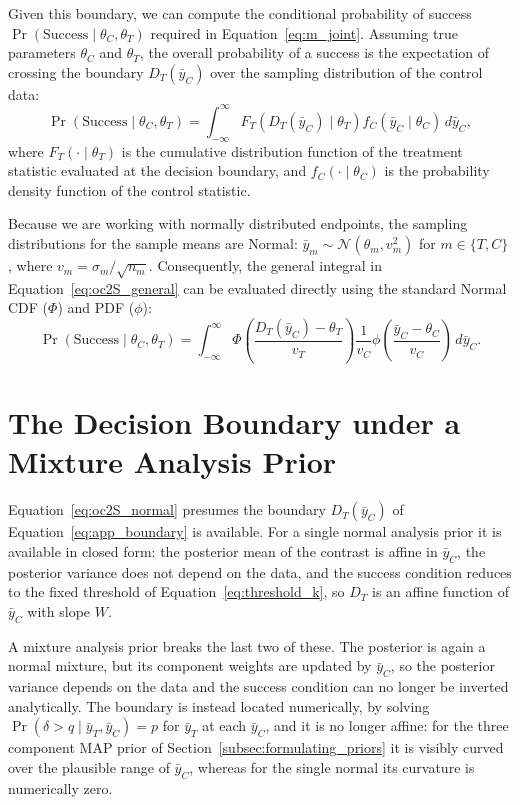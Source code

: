Given this boundary, we can compute the conditional probability of success $\Pr(\text{Success} \mid \theta_C, \theta_T)$ required in Equation~\eqref{eq:m_joint}. Assuming
 true parameters $\theta_C$ and $\theta_T$, the overall probability of a success is the expectation of crossing the boundary $D_T(\bar{y}_C)$ over the sampling
 distribution of the control data:
\begin{equation}
  \label{eq:oc2S_general}
  \Pr(\text{Success} \mid \theta_C, \theta_T) = \int_{-\infty}^{\infty} F_T\left(D_T(\bar{y}_C) \mid \theta_T\right) f_C\left(\bar{y}_C \mid \theta_C\right) \, d\bar{y}_C,
\end{equation}
where $F_T\left(\cdot \mid \theta_T\right)$ is the cumulative distribution function of the treatment statistic evaluated at the decision boundary, and
 $f_C\left(\cdot \mid \theta_C\right)$ is the probability density function of the control statistic.

Because we are working with normally distributed endpoints, the sampling distributions for the sample means are Normal: 
$\bar{y}_m \sim \mathcal{N}(\theta_m, v_m^2)$ for $m \in \{T, C\}$, where $v_m = \sigma_m / \sqrt{n_m}$. Consequently, the general integral in 
Equation~\eqref{eq:oc2S_general} can be evaluated directly using the standard Normal CDF ($\Phi$) and PDF ($\phi$):
\begin{equation}
  \label{eq:oc2S_normal}
  \Pr(\text{Success} \mid \theta_C, \theta_T) = \int_{-\infty}^{\infty} \Phi\left(\frac{D_T(\bar{y}_C) - \theta_T}{v_T}\right) \frac{1}{v_C} \phi\left(\frac{\bar{y}_C - \theta_C}{v_C}\right) \, d\bar{y}_C.
\end{equation}
 

\section{The Decision Boundary under a Mixture Analysis Prior}

Equation~\eqref{eq:oc2S_normal} presumes the boundary $D_T(\bar{y}_C)$ of
Equation~\eqref{eq:app_boundary} is available. For a single normal analysis prior it is available in closed form: the
posterior mean of the contrast is affine in $\bar{y}_C$, the posterior variance does not depend on
the data, and the success condition reduces to the fixed threshold of
Equation~\eqref{eq:threshold_k}, so $D_T$ is an affine function of $\bar{y}_C$ with slope $W$.

A mixture analysis prior breaks the last two of these. The posterior is again a normal mixture, but its
component weights are updated by $\bar{y}_C$, so the posterior variance depends on the data and the
success condition can no longer be inverted analytically. The boundary is instead located
numerically, by solving $\Pr(\delta > q \mid \bar{y}_T, \bar{y}_C) = p$ for $\bar{y}_T$ at each
$\bar{y}_C$, and it is no longer affine: for the three component MAP prior of
Section~\ref{subsec:formulating_priors} it is visibly curved over the plausible range of
$\bar{y}_C$, whereas for the single normal its curvature is numerically zero.

